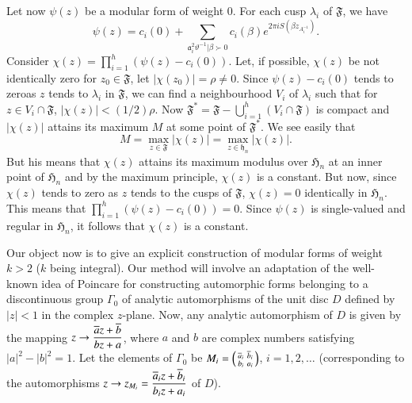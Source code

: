 Let now $\psi(z)$ be a modular form of weight $0$. For each cusp
$\lambda_{i}$ of $\mathfrak{F}$, we have
$$
\psi(z)=c_{i}(0)+\sum_{\mathfrak{a}^{2}_{i}\vartheta^{-1}|\beta \succ
  0}c_{i}(\beta)e^{2\pi 
  iS(\beta z_{A^{-1}_{i}})}.
$$
Consider $\chi(z)=\prod\limits^{h}_{i=1}(\psi(z)-c_{i}(0))$. Let, if
possible, $\chi(z)$ be not identically zero \ie for
$z_{0}\in\mathfrak{F}$, let $|\chi(z_{0})|=\rho\neq 0$. Since
$\psi(z)-c_{i}(0)$ tends to zero\pageoriginale as $z$ tends to
$\lambda_{i}$ in $\mathfrak{F}$, we can find a neighbourhood $V_{i}$
of $\lambda_{i}$ such that for $z\in V_{i}\cap \mathfrak{F}$,
$|\chi(z)|<(1/2)\rho$. Now
$\mathfrak{F}^{\ast}=\mathfrak{F}-\bigcup\limits^{h}_{i=1}(V_{i}\cap
\mathfrak{F})$ is compact and $|\chi(z)|$ attains its maximum $M$ at
some point of $\mathfrak{F}^{\ast}$. We see easily that
$$
M=\max\limits_{z\in\mathfrak{F}}|\chi(z)|=\max\limits_{z\in
  \mathfrak{h}_{n}}|\chi(z)|. 
$$
But his means that $\chi(z)$ attains its maximum modulus over
$\mathfrak{H}_{n}$ at an inner point of $\mathfrak{H}_{n}$ and by the
maximum principle, $\chi(z)$ is a constant. But now, since $\chi(z)$
tends to zero as $z$ tends to the cusps of $\mathfrak{F}$, $\chi(z)=0$
identically in $\mathfrak{H}_{n}$. This means that
$\prod\limits^{h}_{i=1}(\psi(z)-c_{i}(0))=0$. Since $\psi(z)$ is
single-valued and regular in $\mathfrak{H}_{n}$, it follows that
$\chi(z)$ is a constant.

Our object now is to give an explicit construction of modular forms of
weight $k>2$ ($k$ being integral). Our method will involve an
adaptation of the well-known idea of Poincare for constructing
automorphic forms belonging to a discontinuous group $\Gamma_{0}$ of
analytic automorphisms of the unit disc $D$ defined by $|z|<1$ in the
complex $z$-plane. Now, any analytic automorphism of $D$ is given by
the mapping $z\to \dfrac{\overline{a}z+\overline{b}}{bz+a}$, where $a$ and $b$ are
complex numbers satisfying $|a|^{2}-|b|^{2}=1$. Let the elements of
$\Gamma_{0}$ be $M_{i}=\left(\begin{smallmatrix} \overline{a}_{i} &
  \overline{b}_{i}\\ b_{i} & a_{i}\end{smallmatrix}\right)$, $i=1,2,\ldots$
(corresponding to the automorphisms $z\to
z_{M_{i}}=\dfrac{\overline{a}_{i}z+\overline{b}_{i}}{b_{i}z+a_{i}}$ of $D$).

